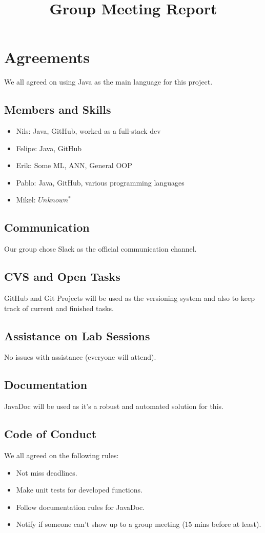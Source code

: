 \documentclass{article}
\title{Group Meeting Report}
\date{}
\begin{document}
\maketitle{}

\section{Agreements}

We all agreed on using Java as the main language for this project.

\subsection{Members and Skills}
\begin{itemize}[leftmargin=2cm]
 \item Nils: Java, GitHub, worked as a full-stack dev
 \item Felipe: Java, GitHub
 \item Erik: Some ML, ANN, General OOP
 \item Pablo: Java, GitHub, various programming languages
 \item Mikel: $Unknown^*$
\end{itemize}

\subsection{Communication}
Our group chose Slack as the official communication channel.

\subsection{CVS and Open Tasks}
GitHub and Git Projects will be used as the versioning system and also to keep track of current and finished tasks.

\subsection{Assistance on Lab Sessions}
No issues with assistance (everyone will attend).

\subsection{Documentation}
JavaDoc will be used as it's a robust and automated solution for this.

\subsection{Code of Conduct}
We all agreed on the following rules:
\begin{itemize}
  \item Not miss deadlines.
  \item Make unit tests for developed functions.
  \item Follow documentation rules for JavaDoc.
  \item Notify if someone can't show up to a group meeting (15 mins before at least).
\end{itemize}
\end{document}
